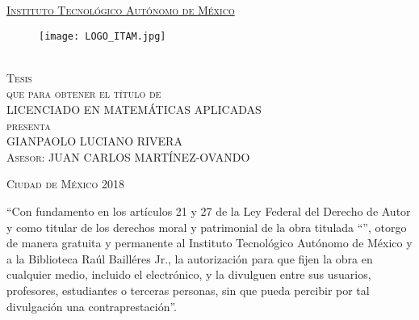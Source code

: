 \documentclass[../Main/Main.tex]{subfiles}
\begin{document}

\begin{titlepage}
\begin{center}

\underline{\textsc{\Large Instituto Tecnológico Autónomo de México}}\\[3em]

\begin{figure}[h]
\begin{center}
\texttt{[image: LOGO\_ITAM.jpg]}
\end{center}
\end{figure}

\vspace{2em}

\textsc{\LARGE \textbf{\tituloMayus}}\\[2em]

\textsc{\large Tesis}\\[1em]

\textsc{que para obtener el título de}\\[1em]

\textsc{LICENCIADO EN MATEMÁTICAS APLICADAS}\\[1em]

\textsc{presenta}\\[1em]

\textsc{\Large GIANPAOLO LUCIANO RIVERA}\\[1em]

\textsc{\large Asesor: JUAN CARLOS MARTÍNEZ-OVANDO}

\end{center}

\vspace*{\fill}
\textsc{Ciudad de México \hspace*{\fill} 2018}

\end{titlepage}

\thispagestyle{empty}
\vspace*{\fill}
\begingroup
``Con fundamento en los artículos 21 y 27 de la Ley Federal del Derecho de Autor y como titular de los derechos moral y patrimonial de la obra titulada ``\textbf{\tituloMayus}'', otorgo de manera gratuita y permanente al Instituto Tecnológico Autónomo de México y a la Biblioteca Raúl Bailléres Jr., la autorización para que fijen la obra en cualquier medio, incluido el electrónico, y la divulguen entre sus usuarios, profesores, estudiantes o terceras personas, sin que pueda percibir por tal divulgación una contraprestación''.
\end{document}
